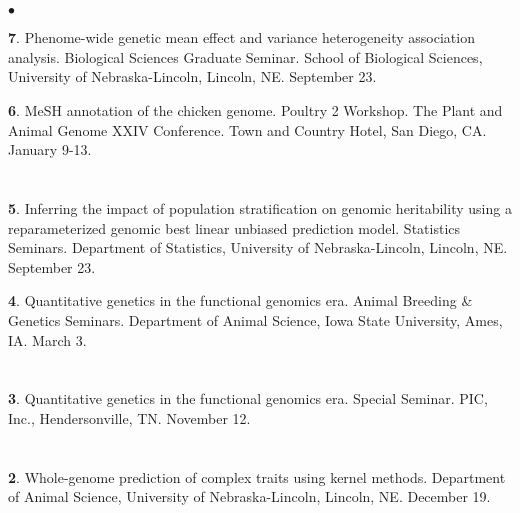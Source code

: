 \documentclass[margin,line,10pt]{res}
\newenvironment{list1}{
  \begin{list}{\ding{113}}{%
      \setlength{\itemsep}{0in}
      \setlength{\parsep}{0in} \setlength{\parskip}{0in}
      \setlength{\topsep}{0in} \setlength{\partopsep}{0in} 
      \setlength{\leftmargin}{0.17in}}}{\end{list}}
\newenvironment{list2}{
  \begin{list}{$\bullet$}{%
      \setlength{\itemsep}{0in}
      \setlength{\parsep}{0in} \setlength{\parskip}{0in}
      \setlength{\topsep}{0in} \setlength{\partopsep}{0in} 
      \setlength{\leftmargin}{0.2in}}}{\end{list}}
\begin{document}
\begin{resume}
\section{}
\begin{list2}
\item [{\bf 7}.] Phenome-wide genetic mean effect and variance heterogeneity association analysis. Biological Sciences Graduate Seminar. School of Biological Sciences, University of Nebraska-Lincoln, Lincoln, NE. September 23.
  
  \vspace{0.5cm}
  
  \item [{\bf 6}.] MeSH annotation of the chicken genome. Poultry 2 Workshop. The Plant and Animal Genome XXIV Conference. Town and Country Hotel, San Diego, CA. January 9-13. 
  
\end{list2}

\section{}
\begin{list1}
\item [{\bf 5}.] Inferring the impact of population stratification on genomic heritability using a reparameterized genomic best linear unbiased prediction model. Statistics Seminars. Department of Statistics, University of Nebraska-Lincoln, Lincoln, NE. September 23. 

  \vspace{0.5cm}

\item [{\bf 4}.] Quantitative genetics in the functional genomics era. Animal Breeding \& Genetics Seminars. Department of Animal Science, Iowa State University, Ames, IA. March 3. 
\end{list1}

\section{}
\begin{list1}
\item [{\bf 3}.] Quantitative genetics in the functional genomics era. Special Seminar. PIC, Inc., Hendersonville, TN.  November 12. 
\end{list1}

\section{}
\begin{list1}
\item [{\bf 2}.] Whole-genome prediction of complex traits using kernel methods. Department of Animal Science, University of Nebraska-Lincoln, Lincoln, NE. December 19. 
\end{list1}


\end{resume}
\end{document}
